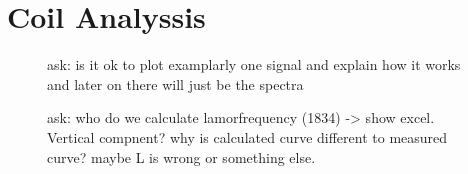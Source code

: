 \section{Coil Analyssis}
\label{sec:CoilAnalyssis}

\begin{figure}[H]
    \centering
    
    \caption[]{ask: is it ok to plot examplarly one signal and explain how it works and later on there will just be the spectra}
    \label{fig:PulsandcollectValesignal}
\end{figure}



\begin{figure}[H]
    \centering
    
    \caption[]{ask: who do we calculate lamorfrequency (1834) -> show excel. Vertical compnent? \newline
    why is calculated curve different to measured curve? maybe L is wrong or something else.}
    \label{fig:Coilanalyse}
\end{figure}